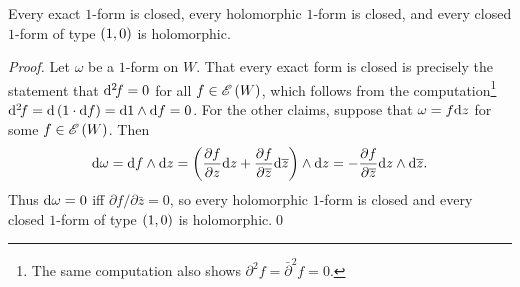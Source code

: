 \documentclass[../Moduli_Spaces_of_Riemann_Surfaces.tex]{subfiles}
\begin{document}
    \begin{proposition}
        Every exact $1$-form is closed, every holomorphic $1$-form is closed, and every closed $1$-form of type $\left(1,0\right)$ is holomorphic.
    \end{proposition}
    \begin{proof}
        Let $\omega$ be a $1$-form on $W$. That every exact form is closed is precisely the statement that $\mathrm{d}^2\!f=0$ for all $f\in\mathscr{E}\left(W\right)$, which follows from the computation\footnote{The same computation also shows $\partial^2\!f=\bar{\partial}^2\!f=0$.} $\mathrm{d}^2\!f=\mathrm{d}\left(1\cdot\mathrm{d} f\right)=\mathrm{d}1\wedge\mathrm{d} f=0$. For the other claims, suppose that $\omega=f\mathrm{d} z$ for some $f\in\mathscr{E}\left(W\right)$. Then
        \begin{equation*}
            \mathrm{d}\omega=\mathrm{d} f\wedge\mathrm{d} z=\left(\frac{\partial f}{\partial z}\mathrm{d} z+\frac{\partial f}{\partial\overline{z}}\mathrm{d}\overline{z}\right)\wedge\mathrm{d} z=-\frac{\partial f}{\partial\overline{z}}\mathrm{d} z\wedge\mathrm{d}\overline{z}.
        \end{equation*}
        Thus $\mathrm{d}\omega=0$ iff $\partial f/\partial\bar{z}=0$, so every holomorphic $1$-form is closed and every closed $1$-form of type $\left(1,0\right)$ is holomorphic.\qed
    \end{proof}
\end{document}
